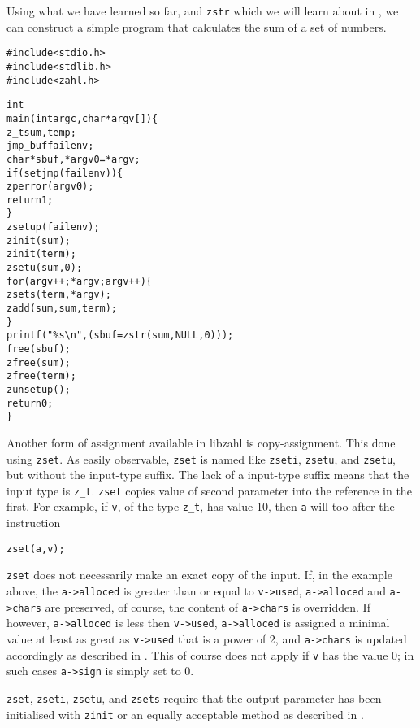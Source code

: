 Using what we have learned so far, and {\tt zstr}
which we will learn about in ,
we can construct a simple program that calculates the
sum of a set of numbers.

\begin{alltt}
   \textcolor{c}{#include <stdio.h>
   #include <stdlib.h>
   #include <zahl.h>}

   int
   main(int argc, char *argv[]) \{
       z_t sum, temp;
       \textcolor{c}{jmp_buf failenv;
       char *sbuf, *argv0 = *argv;
       if (setjmp(failenv)) \{
           zperror(argv0);
           return 1;
       \}
       zsetup(failenv);
       zinit(sum);
       zinit(term);}
       zsetu(sum, 0);
       for (argv++; *argv; argv++) \{
           zsets(term, *argv);
           zadd(sum, sum, term);
       \}
       \textcolor{c}{printf("\%s\textbackslash{}n", (sbuf = zstr(sum, NULL, 0)));
       free(sbuf);
       zfree(sum);
       zfree(term);
       zunsetup();
       return 0;}
   \}
\end{alltt}

Another form of assignment available in libzahl is
copy-assignment. This done using {\tt zset}. As
easily observable, {\tt zset} is named like
{\tt zseti}, {\tt zsetu}, and {\tt zsetu}, but
without the input-type suffix. The lack of a
input-type suffix means that the input type is
{\tt z\_t}. {\tt zset} copies value of second
parameter into the reference in the first. For
example, if {\tt v}, of the type {\tt z\_t}, has
value 10, then {\tt a} will too after the instruction

\begin{alltt}
   zset(a, v);
\end{alltt}

{\tt zset} does not necessarily make an exact
copy of the input. If, in the example above, the
{\tt a->alloced} is greater than or equal to
{\tt v->used}, {\tt a->alloced} and {\tt a->chars}
are preserved, of course, the content of
{\tt a->chars} is overridden. If however,
{\tt a->alloced} is less then {\tt v->used},
{\tt a->alloced} is assigned a minimal value at
least as great as {\tt v->used} that is a power
of 2, and {\tt a->chars} is updated accordingly
as described in .
This of course does not apply if {\tt v} has the
value 0; in such cases {\tt a->sign} is simply
set to 0.

{\tt zset}, {\tt zseti}, {\tt zsetu}, and
{\tt zsets} require that the output-parameter
has been initialised with {\tt zinit} or an
equally acceptable method as described in
.

